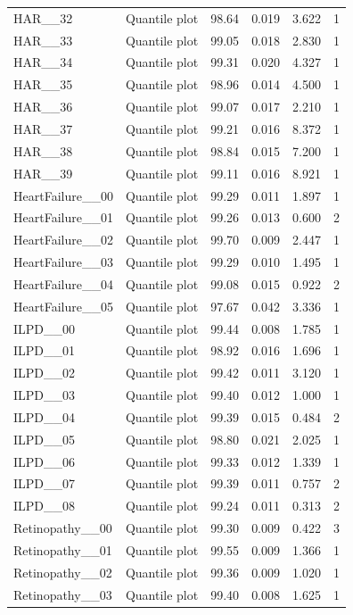 \begin{longtable}{llrrrr}
HAR\_\_32 & Quantile plot & 98.64 & 0.019 & 3.622 & 1\\
HAR\_\_33 & Quantile plot & 99.05 & 0.018 & 2.830 & 1\\
HAR\_\_34 & Quantile plot & 99.31 & 0.020 & 4.327 & 1\\
HAR\_\_35 & Quantile plot & 98.96 & 0.014 & 4.500 & 1\\
HAR\_\_36 & Quantile plot & 99.07 & 0.017 & 2.210 & 1\\
HAR\_\_37 & Quantile plot & 99.21 & 0.016 & 8.372 & 1\\
HAR\_\_38 & Quantile plot & 98.84 & 0.015 & 7.200 & 1\\
HAR\_\_39 & Quantile plot & 99.11 & 0.016 & 8.921 & 1\\
HeartFailure\_\_00 & Quantile plot & 99.29 & 0.011 & 1.897 & 1\\
HeartFailure\_\_01 & Quantile plot & 99.26 & 0.013 & 0.600 & 2\\
HeartFailure\_\_02 & Quantile plot & 99.70 & 0.009 & 2.447 & 1\\
HeartFailure\_\_03 & Quantile plot & 99.29 & 0.010 & 1.495 & 1\\
HeartFailure\_\_04 & Quantile plot & 99.08 & 0.015 & 0.922 & 2\\
HeartFailure\_\_05 & Quantile plot & 97.67 & 0.042 & 3.336 & 1\\
ILPD\_\_00 & Quantile plot & 99.44 & 0.008 & 1.785 & 1\\
ILPD\_\_01 & Quantile plot & 98.92 & 0.016 & 1.696 & 1\\
ILPD\_\_02 & Quantile plot & 99.42 & 0.011 & 3.120 & 1\\
ILPD\_\_03 & Quantile plot & 99.40 & 0.012 & 1.000 & 1\\
ILPD\_\_04 & Quantile plot & 99.39 & 0.015 & 0.484 & 2\\
ILPD\_\_05 & Quantile plot & 98.80 & 0.021 & 2.025 & 1\\
ILPD\_\_06 & Quantile plot & 99.33 & 0.012 & 1.339 & 1\\
ILPD\_\_07 & Quantile plot & 99.39 & 0.011 & 0.757 & 2\\
ILPD\_\_08 & Quantile plot & 99.24 & 0.011 & 0.313 & 2\\
Retinopathy\_\_00 & Quantile plot & 99.30 & 0.009 & 0.422 & 3\\
Retinopathy\_\_01 & Quantile plot & 99.55 & 0.009 & 1.366 & 1\\
Retinopathy\_\_02 & Quantile plot & 99.36 & 0.009 & 1.020 & 1\\
Retinopathy\_\_03 & Quantile plot & 99.40 & 0.008 & 1.625 & 1\\

\end{longtable}
